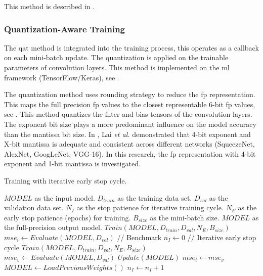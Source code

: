 This method is described in .

\subsubsection{Quantization-Aware Training}
The \gls{qat} method is integrated into the training process, this operates as a callback on each mini-batch update. The quantization is applied on the trainable parameters of convolution layers. This method is implemented on the \gls{ml} framework (TensorFlow/Keras), see .

The quantization method uses rounding strategy to reduce the \gls{fp} representation. This maps the full precision \gls{fp} values to the closest representable 6-bit \gls{fp} values, see . This method quantizes the filter and bias tensors of the convolution layers. The exponent bit size plays a more predominant influence on the model accuracy than the mantissa bit size. In \cite{lai2017deep}, Lai \textit{et al.} demonstrated that 4-bit exponent and X-bit mantissa is adequate and consistent across different networks (SqueezeNet, AlexNet, GoogLeNet, VGG-16). In this research, the \gls{fp} representation with 4-bit exponent and 1-bit mantissa is investigated.

\begin{algorithm}[h!]
	\caption{Training with iterative early stop cycle.}
	\label{alg:training}
	\begin{algorithmic}[1]
		\SetAlgoLined
		\renewcommand{\algorithmicrequire}{\textbf{input:}}
		\renewcommand{\algorithmicensure}{\textbf{output:}}
		\REQUIRE $MODEL$ as the input model.
		\REQUIRE $D_{train}$ as the training data set.
		\REQUIRE $D_{val}$ as the validation data set.
		\REQUIRE $N_{I}$ as the stop patience for iterative training cycle.
		\REQUIRE $N_{E}$ as the early stop patience (epochs) for training.
		\REQUIRE $B_{size}$ as the mini-batch size.
		\ENSURE $MODEL$ as the full-precision output model.
		\STATE $Train(MODEL, D_{train}, D_{val}, N_{E}, B_{size})$
		\STATE $mse_i \gets Evaluate(MODEL, D_{val})$ // Benchmark
		\STATE $n_I \gets 0$
		\STATE // Iterative early stop cycle
		\STATE $Train(MODEL, D_{train}, D_{val}, N_{E}, B_{size})$
		\STATE $mse_v \gets Evaluate(MODEL, D_{val})$
			\STATE $Update(MODEL)$
			\STATE $mse_i \gets mse_v$
		\ELSE
			\STATE $MODEL  \gets LoadPreviousWeights()$
			\STATE $n_I \gets n_I + 1$
		\ENDIF
		\ENDWHILE
	\end{algorithmic}
\end{algorithm}


